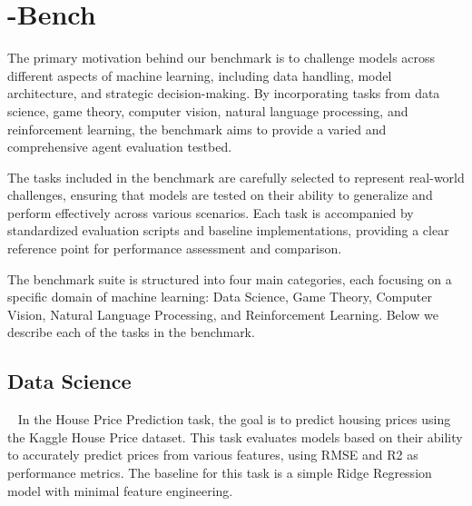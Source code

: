\section{\mlgym-Bench}
\label{sec:benchmark}






The primary motivation behind our benchmark is to challenge models across different aspects of machine learning, including data handling, model architecture, and strategic decision-making.
By incorporating tasks from data science, game theory, computer vision, natural language processing, and reinforcement learning, the benchmark aims to provide a varied and comprehensive agent evaluation testbed.

The tasks included in the benchmark are carefully selected to represent real-world challenges, ensuring that models are tested on their ability to generalize and perform effectively across various scenarios.
Each task is accompanied by standardized evaluation scripts and baseline implementations, providing a clear reference point for performance assessment and comparison.

The benchmark suite is structured into four main categories, each focusing on a specific domain of machine learning: Data Science, Game Theory, Computer Vision, Natural Language Processing, and Reinforcement Learning.
Below we describe each of the tasks in the benchmark.

\subsection{Data Science}

~\citep{kaggle_house_prices} In the House Price Prediction task, the goal is to predict housing prices using the Kaggle House Price dataset.
This task evaluates models based on their ability to accurately predict prices from various features, using RMSE and R2 as performance metrics.
%
The baseline for this task is a simple Ridge Regression model with minimal feature engineering.

